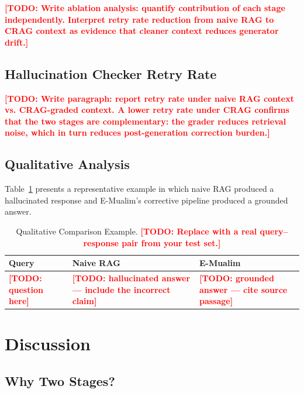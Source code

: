 \documentclass[conference]{IEEEtran}
\newcommand{\todo}[1]{\textcolor{red}{\textbf{[TODO: #1]}}}
\begin{document}
\todo{Write ablation analysis: quantify contribution of each stage
independently. Interpret retry rate reduction from naive RAG to CRAG
context as evidence that cleaner context reduces generator drift.}

\subsection{Hallucination Checker Retry Rate}

\todo{Write paragraph: report retry rate under naive RAG context vs.
CRAG-graded context. A lower retry rate under CRAG confirms that the
two stages are complementary: the grader reduces retrieval noise,
which in turn reduces post-generation correction burden.}

\subsection{Qualitative Analysis}

Table~\ref{tab:qual} presents a representative example in which
naive RAG produced a hallucinated response and E-Mualim's corrective
pipeline produced a grounded answer.

\begin{table}[htbp]
\centering
\caption{Qualitative Comparison Example.
\todo{Replace with a real query--response pair from your test set.}}
\label{tab:qual}
\renewcommand{\arraystretch}{1.3}
\begin{tabularx}{\columnwidth}{p{}
                               X X}
\toprule
\textbf{Query} & \textbf{Naive RAG} & \textbf{E-Mualim} \\
\midrule
\todo{question here}
& \todo{hallucinated answer — include the incorrect claim}
& \todo{grounded answer — cite source passage} \\
\bottomrule
\end{tabularx}
\end{table}

\section{Discussion}
\label{sec:discussion}

\subsection{Why Two Stages?}
\end{document}
